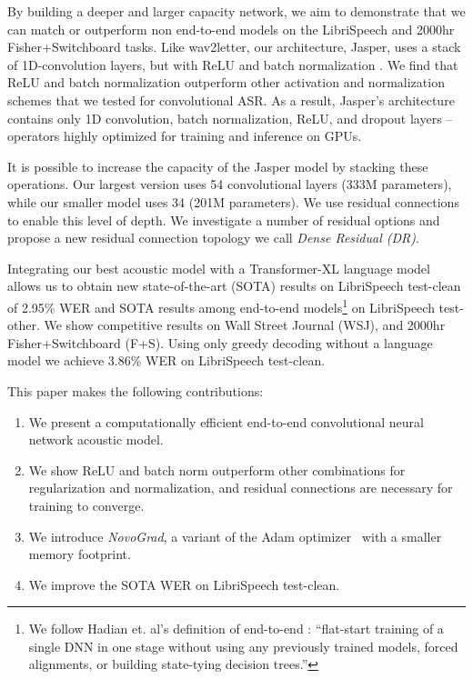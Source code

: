 \documentclass[a4paper]{article}
\begin{document}
By building a deeper and larger capacity network, we aim to demonstrate that we can match or outperform non end-to-end models on the LibriSpeech and 2000hr Fisher+Switchboard tasks. Like wav2letter, our architecture, Jasper, uses a stack of 1D-convolution layers, but with ReLU and batch normalization \cite{IoffeS15BatchNorm}. We find that ReLU and batch normalization outperform other activation and normalization schemes that we tested for convolutional ASR. As a result, Jasper's architecture contains only 1D convolution, batch normalization, ReLU, and dropout layers -- operators highly optimized for training and inference on GPUs.

It is possible to increase the capacity of the Jasper model by stacking these operations. Our largest version uses 54 convolutional layers (333M parameters), while our smaller model uses 34 (201M parameters). We use residual connections to enable this level of depth. We investigate a number of residual options and propose a new residual connection topology we call \textit{Dense Residual (DR)}.

Integrating our best acoustic model with a Transformer-XL \cite{dai2018transformer} language model allows us to obtain new state-of-the-art (SOTA) results on LibriSpeech \cite{panayotov2015librispeech} test-clean of 2.95\% WER and SOTA results among end-to-end models\footnote{We follow Hadian et. al's definition of end-to-end \cite{Hadian2018}: ``flat-start training of a single DNN in one stage without using any previously trained models, forced alignments, or building state-tying decision trees.''} on LibriSpeech test-other. We show competitive results on Wall Street Journal (WSJ), and 2000hr Fisher+Switchboard (F+S).  Using only greedy decoding without a language model we achieve 3.86\% WER on LibriSpeech test-clean.

This paper makes the following contributions:
\begin{enumerate}
    \item We present a computationally efficient end-to-end convolutional neural network acoustic model.
    \item We show ReLU and batch norm outperform other combinations for regularization and normalization, and residual connections are necessary for training to converge.
    \item We introduce \textit{NovoGrad}, a variant of the Adam optimizer~\cite{kingma} with a smaller memory footprint.
    \item We improve the SOTA WER on LibriSpeech test-clean.
\end{enumerate}
\end{document}
